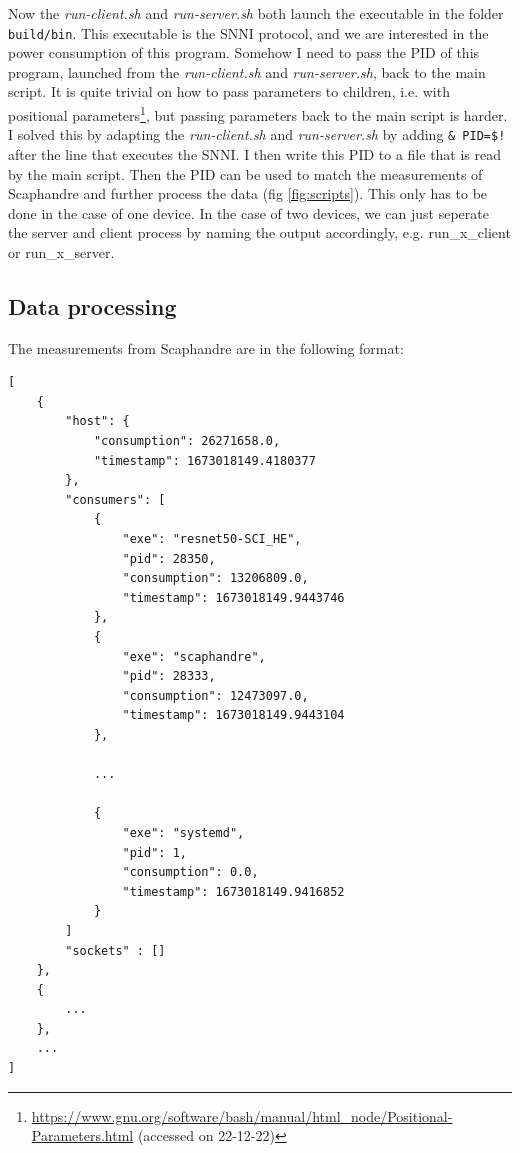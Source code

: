 \documentclass[../thesis.tex]{subfiles}
\begin{document}
Now the \textit{run-client.sh} and \textit{run-server.sh} both launch the executable in the folder \verb|build/bin|. This executable is the SNNI protocol, and we are interested in the power consumption of this program. Somehow I need to pass the PID of this program, launched from the \textit{run-client.sh} and \textit{run-server.sh}, back to the main script. It is quite trivial on how to pass parameters to children, i.e. with positional parameters\footnote{\url{https://www.gnu.org/software/bash/manual/html_node/Positional-Parameters.html} (accessed on 22-12-22)}, but passing parameters back to the main script is harder. I solved this by adapting the \textit{run-client.sh} and \textit{run-server.sh} by adding \verb|& PID=$!| after the line that executes the SNNI. I then write this PID to a file that is read by the main script. Then the PID can be used to match the measurements of Scaphandre and further process the data (fig \ref{fig:scripts}). This only has to be done in the case of one device. In the case of two devices, we can just seperate the server and client process by naming the output accordingly, e.g. run\_x\_client or run\_x\_server. 

\subsection{Data processing}
The measurements from Scaphandre are in the following format:

\begin{lstlisting}
[
    {
        "host": {
            "consumption": 26271658.0,
            "timestamp": 1673018149.4180377
        },
        "consumers": [
            {
                "exe": "resnet50-SCI_HE",
                "pid": 28350,
                "consumption": 13206809.0,
                "timestamp": 1673018149.9443746
            },
            {
                "exe": "scaphandre",
                "pid": 28333,
                "consumption": 12473097.0,
                "timestamp": 1673018149.9443104
            },

            ...

            {
                "exe": "systemd",
                "pid": 1,
                "consumption": 0.0,
                "timestamp": 1673018149.9416852
            }
        ]
        "sockets" : []
    },
    {
        ...
    },
    ...
]
\end{lstlisting}
\end{document}
